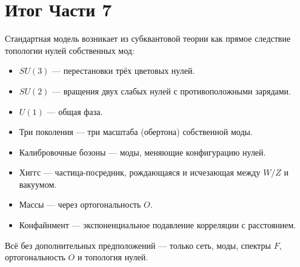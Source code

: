 \documentclass[11pt,a4paper]{article}
\theoremstyle{definition}
\begin{document}
\section*{Итог Части 7}

Стандартная модель возникает из субквантовой теории как прямое следствие топологии нулей собственных мод:

\begin{itemize}
    \item $SU(3)$ — перестановки трёх цветовых нулей.
    \item $SU(2)$ — вращения двух слабых нулей с противоположными зарядами.
    \item $U(1)$ — общая фаза.
    \item Три поколения — три масштаба (обертона) собственной моды.
    \item Калибровочные бозоны — моды, меняющие конфигурацию нулей.
    \item Хиггс — частица-посредник, рождающаяся и исчезающая между $W/Z$ и вакуумом.
    \item Массы — через ортогональность $O$.
    \item Конфайнмент — экспоненциальное подавление корреляции с расстоянием.
\end{itemize}

Всё без дополнительных предположений — только сеть, моды, спектры $F$, ортогональность $O$ и топология нулей.
\end{document}
